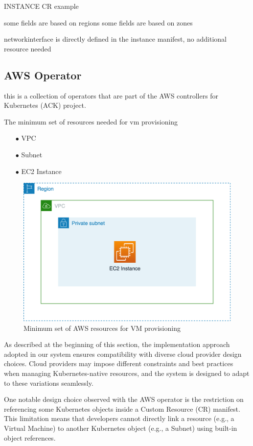 INSTANCE CR example

some fields are based on regions
some fields are based on zones


networkinterface is directly defined in the instance manifest,
no additional resource needed



\subsection{AWS Operator}

this is a collection of operators that are part of the AWS controllers for Kubernetes (ACK) project.

The minimum set of resources needed for vm provisioning

\begin{itemize}[itemsep=0.2pt, topsep=1pt] 
\item[$\bullet$] VPC
\item[$\bullet$] Subnet
\item[$\bullet$] EC2 Instance
\end{itemize}

\begin{figure}[H]
\centering
\includegraphics[width=0.75\linewidth]{images/aws.png}
\caption{Minimum set of AWS resources for VM provisioning}
\label{fig:aws}
\end{figure}

As described at the beginning of this section, the implementation approach adopted in our system ensures compatibility with diverse cloud provider design choices. Cloud providers may impose different constraints and best practices when managing Kubernetes-native resources, and the system is designed to adapt to these variations seamlessly.

One notable design choice observed with the AWS operator is the restriction on referencing some Kubernetes objects inside a Custom Resource (CR) manifest. This limitation means that developers cannot directly link a resource (e.g., a Virtual Machine) to another Kubernetes object (e.g., a Subnet) using built-in object references.

